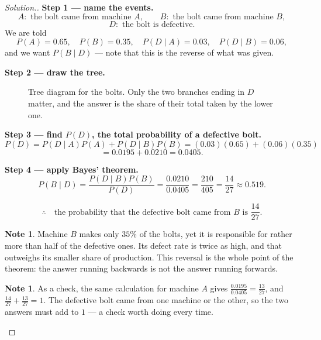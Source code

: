 \documentclass[11pt,a4paper]{article}
\theoremstyle{definition}
\newtheorem{note}[thm]{Note}
\newenvironment{solution}
  {\renewcommand{\qedsymbol}{}\begin{proof}[\textit{Solution}.]}
  {\end{proof}}
\begin{document}
\begin{solution}
\textbf{Step 1 --- name the events.}
$$A:\text{ the bolt came from machine } A,\qquad B:\text{ the bolt came from machine } B,$$
$$D:\text{ the bolt is defective}.$$
We are told
$$P(A)=0.65,\quad P(B)=0.35,\quad P(D\mid A)=0.03,\quad P(D\mid B)=0.06,$$
and we want $P(B\mid D)$ --- note that this is the reverse of what was given.

\textbf{Step 2 --- draw the tree.}

\begin{figure}[H]
\centering
{}
\caption{Tree diagram for the bolts. Only the two branches ending in $D$ matter, and the answer is the share of their total taken by the lower one.}
\end{figure}

\textbf{Step 3 --- find $P(D)$, the total probability of a defective bolt.}
$$P(D)=P(D\mid A)P(A)+P(D\mid B)P(B)=(0.03)(0.65)+(0.06)(0.35)$$
$$=0.0195+0.0210=0.0405.$$

\textbf{Step 4 --- apply Bayes' theorem.}
$$P(B\mid D)=\frac{P(D\mid B)P(B)}{P(D)}=\frac{0.0210}{0.0405}=\frac{210}{405}
=\frac{14}{27}\approx 0.519.$$

$$\therefore\quad \text{the probability that the defective bolt came from } B
\text{ is } \frac{14}{27}.$$

\begin{note}
Machine $B$ makes only $35\%$ of the bolts, yet it is responsible for rather more than
half of the defective ones. Its defect rate is twice as high, and that outweighs its
smaller share of production. This reversal is the whole point of the theorem: the answer
running backwards is not the answer running forwards.
\end{note}

\begin{note}
As a check, the same calculation for machine $A$ gives
$\frac{0.0195}{0.0405}=\frac{13}{27}$, and
$\frac{14}{27}+\frac{13}{27}=1$. The defective bolt came from one machine or the other,
so the two answers must add to $1$ --- a check worth doing every time.
\end{note}
\end{solution}
\end{document}
